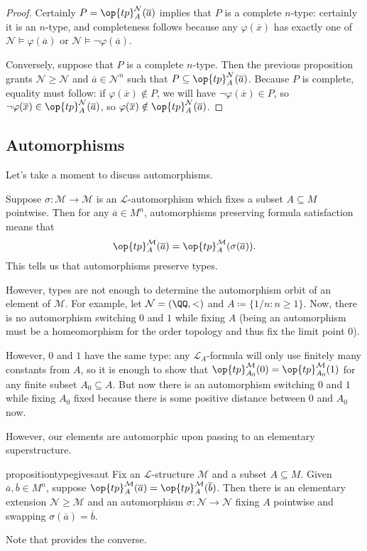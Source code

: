 \documentclass[../notes.tex]{subfiles}
\begin{document}
\begin{proof}
	Certainly $P=\op{tp}_{A}^{\mathcal N}(\overline a)$ implies that $P$ is a complete $n$-type: certainly it is an $n$-type, and completeness follows because any $\varphi(\overline x)$ has exactly one of $\mathcal N\models\varphi(\overline a)$ or $\mathcal N\models\lnot\varphi(\overline a)$.

	Conversely, suppose that $P$ is a complete $n$-type. Then the previous proposition grants $\mathcal N\ge\mathcal N$ and $\overline a\in\mathcal N^n$ such that $P\subseteq\op{tp}^{\mathcal N}_A(\overline a)$. Because $P$ is complete, equality must follow: if $\varphi(\overline x)\notin P$, we will have $\lnot\varphi(\overline x)\in P$, so $\lnot\varphi(\overline x)\in\op{tp}^{\mathcal N}_A(\overline a)$, so $\varphi(\overline x)\notin\op{tp}^{\mathcal N}_A(\overline a)$.
\end{proof}

\subsection{Automorphisms}
Let's take a moment to discuss automorphisms.
\begin{remark} \label{rem:aut-preserves-type}
	Suppose $\sigma\colon\mathcal M\to\mathcal M$ is an $\mathcal L$-automorphism which fixes a subset $A\subseteq M$ pointwise. Then for any $\overline a\in M^n$, automorphisms preserving formula satisfaction means that
	\[\op{tp}^{\mathcal M}_A(\overline a)=\op{tp}^{\mathcal M}_A(\sigma(\overline a)).\]
	This tells us that automorphisms preserve types.
\end{remark}
\begin{example}
	However, types are not enough to determine the automorphism orbit of an element of $\mathcal M$. For example, let $\mathcal N=(\QQ,<)$ and $A\coloneqq\{1/n:n\ge1\}$. Now, there is no automorphism switching $0$ and $1$ while fixing $A$ (being an automorphism must be a homeomorphism for the order topology and thus fix the limit point $0$).
	
	However, $0$ and $1$ have the same type: any $\mathcal L_A$-formula will only use finitely many constants from $A$, so it is enough to show that $\op{tp}^{\mathcal M}_{A_0}(0)=\op{tp}^{\mathcal M}_{A_0}(1)$ for any finite subset $A_0\subseteq A$. But now there is an automorphism switching $0$ and $1$ while fixing $A_0$ fixed because there is some positive distance between $0$ and $A_0$ now.
\end{example}
However, our elements are automorphic upon passing to an elementary superstructure.
\begin{restatable}{proposition}{typegivesaut} \label{prop:type-gives-aut}
	Fix an $\mathcal L$-structure $\mathcal M$ and a subset $A\subseteq M$. Given $\overline a,\overline b\in M^n$, suppose $\op{tp}^{\mathcal M}_A(\overline a)=\op{tp}^{\mathcal M}_A(\overline b)$. Then there is an elementary extension $\mathcal N\ge\mathcal M$ and an automorphism $\sigma\colon\mathcal N\to\mathcal N$ fixing $A$ pointwise and swapping $\sigma(\overline a)=\overline b$.
\end{restatable}
\noindent Note that  provides the converse.
\end{document}
